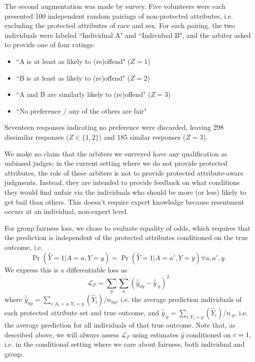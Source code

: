        The second augmentation was made by survey.  Five volunteers were each presented 100 independent random pairings of non-protected attributes, i.e. excluding the protected attributes of race and sex.  For each pairing, the two individuals were labeled ``Individual A" and ``Individual B", and the arbiter asked to provide one of four ratings:
        \begin{itemize}
            \item ``A is at least as likely to (re)offend" ($Z = 1$)
            \item ``B is at least as likely to (re)offend" ($Z = 2$)
            \item ``A and B are similarly likely to (re)offend" ($Z = 3$)
            \item ``No preference / any of the others are fair"
        \end{itemize}
        Seventeen responses indicating no preference were discarded, leaving 298 dissimilar responses ($Z \in \{1, 2\}$) and 185 similar responses ($Z = 3$).

        We make no claim that the arbiters we surveyed have any qualification as unbiased judges; in the current setting where we do not provide protected attributes, the role of these arbiters is not to provide protected attribute-aware judgments.  Instead, they are intended to provide feedback on what conditions they would find unfair via the individuals who should be more (or less) likely to get bail than others.  This doesn't require expert knowledge because resentment occurs at an individual, non-expert level.

        For group fairness loss, we chose to evaluate equality of odds, which requires that the prediction is independent of the protected attributes conditioned on the true outcome, i.e.
            $$ \Pr(\hat{Y} = 1 | A = a, Y = y) = \Pr(\hat{Y} = 1 | A = a', Y = y) \forall a, a', y .$$
        We express this is a differentiable loss as 
            $$ \mathcal{L}_F = \sum\limits_{y} \sum\limits_{a} \left( \bar{\hat{y}}_{ay} - \bar{\hat{y}}_{\cdot y} \right)^2 $$
        where $\bar{\hat{y}}_{ay} = \sum_{i: A_i = a, Y_i = y}(\hat{Y}_i) / n_{ay}$, i.e. the average prediction individuals of each protected attribute set and true outcome, and $\bar{\hat{y}}_{\cdot y} = \sum_{i: Y_i = y}(\hat{Y}_i) / n_{\cdot y}$, i.e. the average prediction for all individuals of that true outcome.  Note that, as described above, we will always assess $\mathcal{L}_F$ using estimates $\hat{y}$ conditioned on $c = 1$, i.e. in the conditional setting where we care about fairness, both individual and group. 
        
